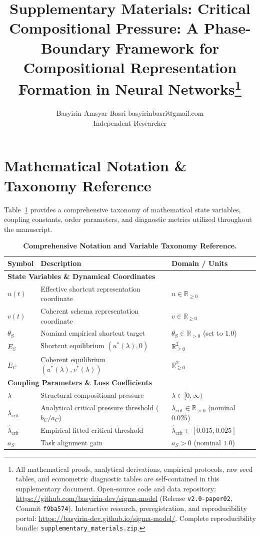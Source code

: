 \documentclass{article}
\title{Supplementary Materials: Critical Compositional Pressure: A Phase-Boundary Framework for Compositional Representation Formation in Neural Networks\thanks{All mathematical proofs, analytical derivations, empirical protocols, raw seed tables, and econometric diagnostic tables are self-contained in this supplementary document. Open-source code and data repository: \url{https://github.com/basyirin-dev/sigma-model} (Release \texttt{v2.0-paper02}, Commit \texttt{f9ba574}). Interactive research, preregistration, and reproducibility portal: \url{https://basyirin-dev.github.io/sigma-model/}. Complete reproducibility bundle: \texttt{supplementary\_materials.zip}.}}
\author{\name Basyirin Amsyar Basri \email basyirinbasri@gmail.com \\
      \addr Independent Researcher}
\theoremstyle{plain}
\theoremstyle{definition}
\begin{document}
\maketitle

\appendix

\section{Mathematical Notation \& Taxonomy Reference}
\label{sec:appendix_notation}

Table~\ref{tab:notation_taxonomy} provides a comprehensive taxonomy of mathematical state variables, coupling constants, order parameters, and diagnostic metrics utilized throughout the manuscript.

\begin{table}[h]
\centering
\caption{\textbf{Comprehensive Notation and Variable Taxonomy Reference.}}
\label{tab:notation_taxonomy}
\vskip 0.1in
\begin{small}
\begin{tabular}{lll}
\toprule
Symbol & Description & Domain / Units \\
\midrule
\multicolumn{3}{l}{\textbf{State Variables \& Dynamical Coordinates}} \\
$u(t)$ & Effective shortcut representation coordinate & $u \in \mathbb{R}_{\ge 0}$ \\
$v(t)$ & Coherent schema representation coordinate & $v \in \mathbb{R}_{\ge 0}$ \\
$\theta_S$ & Nominal empirical shortcut target & $\theta_S \in \mathbb{R}_{> 0}$ (set to $1.0$) \\
$E_S$ & Shortcut equilibrium $(u^*(\lambda), 0)$ & $\mathbb{R}_{\ge 0}^2$ \\
$E_C$ & Coherent equilibrium $(u^*(\lambda), v^*(\lambda))$ & $\mathbb{R}_{\ge 0}^2$ \\
\midrule
\multicolumn{3}{l}{\textbf{Coupling Parameters \& Loss Coefficients}} \\
$\lambda$ & Structural compositional pressure & $\lambda \in [0, \infty)$ \\
$\lambda_{\text{crit}}$ & Analytical critical pressure threshold ($b_C / a_C$) & $\lambda_{\text{crit}} \in \mathbb{R}_{> 0}$ (nominal $0.025$) \\
$\hat{\lambda}_{\text{crit}}$ & Empirical fitted critical threshold & $\hat{\lambda}_{\text{crit}} \in [0.015, 0.025]$ \\
$a_S$ & Task alignment gain & $a_S > 0$ (nominal $1.0$) \\

\end{tabular}
\end{small}
\end{table}
\end{document}
